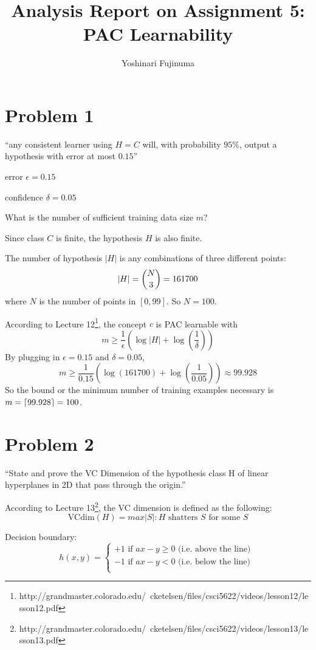 \documentclass[11pt]{article}
\DeclarePairedDelimiter\ceil{\lceil}{\rceil}
\begin{document}
\title{Analysis Report on Assignment 5: PAC Learnability}
\author{Yoshinari Fujinuma}
\date{}
\maketitle

\section{Problem 1}
``any consistent learner using $H=C$ will, with probability $95\%$, output a hypothesis with error at most $0.15$''

error $\epsilon = 0.15$

confidence $\delta = 0.05$

What is the number of sufficient training data size $m$?

Since class $C$ is finite, the hypothesis $H$ is also finite.

The number of hypothesis $|H|$ is any combinations of three different points:
$$
|H| = \dbinom{N}{3} = 161700
$$
where $N$ is the number of points in $[0, 99]$. So $N = 100$.

According to Lecture 12\footnote{http://grandmaster.colorado.edu/~cketelsen/files/csci5622/videos/lesson12/lesson12.pdf}, the concept $c$ is PAC learnable with 
$$
m \geq \frac{1}{\epsilon}(\log |H| + \log(\frac{1}{\delta}))
$$
By plugging in $\epsilon = 0.15$ and $\delta = 0.05$, 
$$
m \geq \frac{1}{0.15}(\log(161700) + \log(\frac{1}{0.05})) \approx 99.928
$$
So the bound or the minimum number of training examples necessary is $m = \ceil{99.928} = 100$.


\section{Problem 2}
``State and prove the VC Dimension of the hypothesis class H of linear hyperplanes in 2D that pass through the origin.''

According to Lecture 13\footnote{http://grandmaster.colorado.edu/~cketelsen/files/csci5622/videos/lesson13/lesson13.pdf}, the VC dimension is defined as the following:
$$
\mbox{VCdim}(H) = max{|S|: H \mbox{ shatters } S \mbox{ for some } S}
$$

Decision boundary: 
$$ 
h(x, y) = \begin{cases} 
          +1 \mbox{ if } ax - y \geq 0 \mbox{ (i.e. above the line) }\\
          -1 \mbox{ if } ax - y < 0 \mbox{ (i.e. below the line) }\\
\end{cases}
$$
\end{document}
